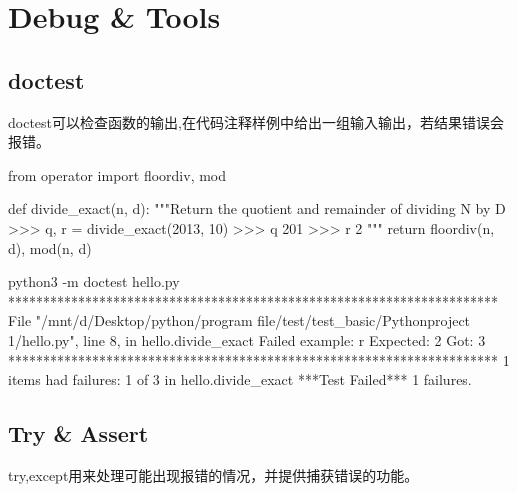 \section{Debug \& Tools}

  \subsection{doctest}
    doctest可以检查函数的输出,在代码注释样例中给出一组输入输出，若结果错误会报错。
    \begin{codeblock}[language=python, caption={doctest hello.py}]
      from operator import floordiv, mod

      def divide_exact(n, d):
        """Return the quotient and remainder of  dividing N by D
        >>> q, r = divide_exact(2013, 10)
        >>> q
        201
        >>> r
        2
        """
        return floordiv(n, d), mod(n, d)
    \end{codeblock}

    \begin{codeblock}[language=bash, caption={doctest bash}]
      python3 -m doctest hello.py
      **********************************************************************
      File "/mnt/d/Desktop/python/program file/test/test_basic/Pythonproject
      1/hello.py", line 8, in hello.divide_exact
      Failed example:
          r
      Expected:
          2
      Got:
          3
      **********************************************************************
      1 items had failures:
        1 of   3 in hello.divide_exact
      ***Test Failed*** 1 failures.
    \end{codeblock}

  \subsection{Try \& Assert}
    try,except用来处理可能出现报错的情况，并提供捕获错误的功能。


